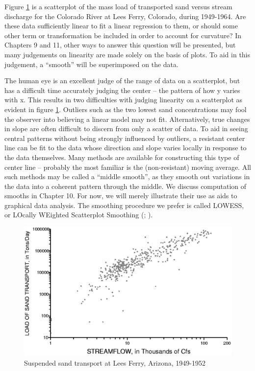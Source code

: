 \documentclass[]{book}
\begin{document}
Figure \ref{fig:fig-2-24} is a scatterplot of the mass load of transported sand versus stream discharge for the Colorado River at Lees Ferry, Colorado, during 1949-1964. Are these data sufficiently linear to fit a linear regression to them, or should some other term or transformation be included in order to account for curvature? In Chapters 9 and 11, other ways to answer this question will be presented, but many judgements on linearity are made solely on the basis of plots. To aid in this judgement, a ``smooth'' will be superimposed on the data.

The human eye is an excellent judge of the range of data on a scatterplot, but has a difficult time accurately judging the center -- the pattern of how y varies with x. This results in two difficulties with judging linearity on a scatterplot as evident in figure \ref{fig:fig-2-24}. Outliers such as the two lowest sand concentrations may fool the observer into believing a linear model may not fit. Alternatively, true changes in slope are often difficult to discern from only a scatter of data. To aid in seeing central patterns without being strongly influenced by outliers, a resistant center line can be fit to the data whose direction and slope varies locally in response to the data themselves. Many methods are available for constructing this type of center line -- probably the most familiar is the (non-resistant) moving average. All such methods may be called a ``middle smooth'', as they smooth out variations in the data into a coherent pattern through the middle. We discuss computation of smooths in Chapter 10. For now, we will merely illustrate their use as aids to graphical data analysis. The smoothing procedure we prefer is called LOWESS, or LOcally WEighted Scatterplot Smoothing (\citet{cleveland_many_1984}; \citet{cleveland_graphical_1985}).

\begin{figure}

{\centering \includegraphics[width=13.31in]{figures/2_24} 

}

\caption{Suspended sand transport at Lees Ferry, Arizona, 1949-1952}\label{fig:fig-2-24}
\end{figure}
\end{document}
